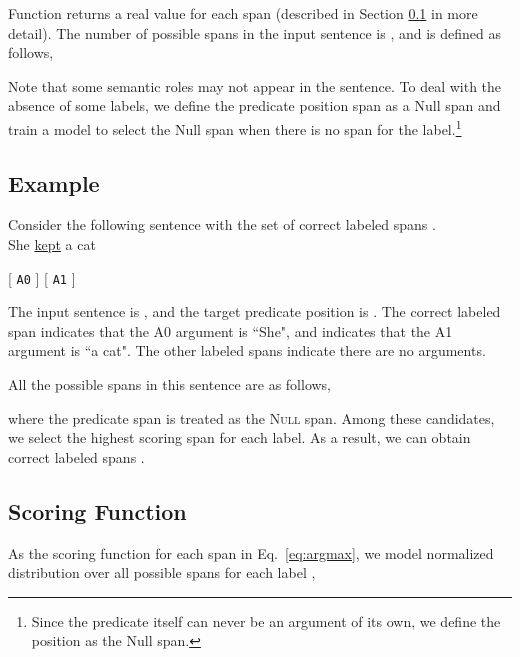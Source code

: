 \documentclass[11pt,a4paper]{article}
\begin{document}
\noindent
Function  returns a real value for each span  (described in Section \ref{sec:score} in more detail).
The number of possible spans  in the input sentence  is , and  is defined as follows,


\noindent
Note that some semantic roles may not appear in the sentence.
To deal with the absence of some labels, we define the predicate position span  as a {\sc Null} span and train a model to select the {\sc Null} span when there is no span for the label.\footnote{Since the predicate itself can never be an argument of its own, we define the position as the {\sc Null} span.}

\subsection*{Example}
Consider the following sentence with the set of correct labeled spans .\\

\hspace{1.5cm} She \hspace{0.2cm} \underline{kept} \hspace{0.2cm} a \hspace{0.2cm} cat 

\hspace{1.4cm} [\hspace{0.05cm} {\tt A0} \hspace{0.05cm}] \hspace{1.1cm} [ \hspace{0.3cm} {\tt A1} \hspace{0.3cm}]


\noindent
The input sentence is , and the target predicate position is .
The correct labeled span  indicates that the A0 argument is ``She", and  indicates that the A1 argument is ``a cat".
The other labeled spans  indicate there are no arguments.

All the possible spans in this sentence are as follows,


\noindent
where the predicate span  is treated as the \textsc{Null} span.
Among these candidates, we select the highest scoring span for each label.
As a result, we can obtain correct labeled spans .

\subsection{Scoring Function}
\label{sec:score}
As the scoring function for each span in Eq.~\ref{eq:argmax}, we model normalized distribution over all possible spans  for each label ,
\end{document}
